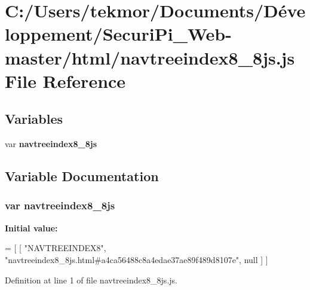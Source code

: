 \section{C\+:/\+Users/tekmor/\+Documents/\+Développement/\+Securi\+Pi\+\_\+\+Web-\/master/html/navtreeindex8\+\_\+8js.js File Reference}
\label{navtreeindex8__8js_8js}
\subsection*{Variables}
\begin{DoxyCompactItemize}
\item 
var {\bf navtreeindex8\+\_\+8js}
\end{DoxyCompactItemize}


\subsection{Variable Documentation}
\subsubsection[{navtreeindex8\+\_\+8js}]{\setlength{\rightskip}{0pt plus 5cm}var navtreeindex8\+\_\+8js}\label{navtreeindex8__8js_8js_a48639e8d7b55cc16214f0713429026d1}
{\bfseries Initial value\+:}
\begin{DoxyCode}
=
[
    [ \textcolor{stringliteral}{"NAVTREEINDEX8"}, \textcolor{stringliteral}{"navtreeindex8\_8js.html#a4ca56488c8a4edae37ae89f489d8107e"}, null ]
]
\end{DoxyCode}


Definition at line 1 of file navtreeindex8\+\_\+8js.\+js.


